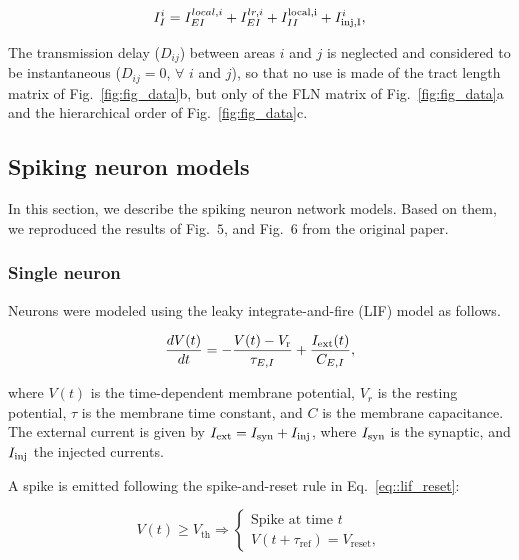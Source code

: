 \begin{equation}
    I^{i}_{I} = I_{EI}^{local,i} + I^{lr,i}_{EI} + I^{\rm local,i}_{II} + I_{\rm inj, I}^{i},
    \label{eq:total_current_i}
\end{equation}

The transmission delay ($D_{ij}$) between areas $i$ and $j$ is neglected and considered to be instantaneous ($D_{ij}=0$, $\forall$  $i$ and $j$), so that no use is made of the tract length matrix of Fig.~\ref{fig:fig_data}b, but only of the FLN matrix of Fig.~\ref{fig:fig_data}a and the hierarchical order of Fig.~\ref{fig:fig_data}c. 


\subsection{Spiking neuron models}\label{spike_model}

In this section, we describe the spiking neuron network models. Based on them, we reproduced the results of Fig.~$5$, and Fig.~$6$ from the original paper.

\subsubsection{Single neuron}\label{lif_single} Neurons were modeled using the leaky integrate-and-fire (LIF) model  as
follows.

\begin{equation}
\frac{dV(t)}{dt} = -\frac{V(t) - V_{\rm r}}{\tau_{E,I}} + \frac{I_{\rm ext}(t)}{C_{E,I}},
\label{eq:lif_din}
\end{equation}  

\noindent where $V(t)$ is the time-dependent membrane potential, $V_r$ is the resting potential, $\tau$ is the membrane time constant, and $C$ is the membrane capacitance. The external current is given by $I_{\rm ext} = I_{\rm syn} + I_{\rm inj}$, where $I_{\rm syn}$ is the synaptic, and  $I_{\rm inj}$ the injected currents.

A spike is emitted following the spike-and-reset rule in Eq.~\ref{eq::lif_reset}:

\begin{equation}
V(t) \geq V_{\text{th}} \Rightarrow
\begin{cases}
\textrm{Spike at time $t$}\\
V(t + \tau_{\text{ref}}) = V_{\text{reset}},
\end{cases}
\label{eq::lif_reset}
\end{equation}

